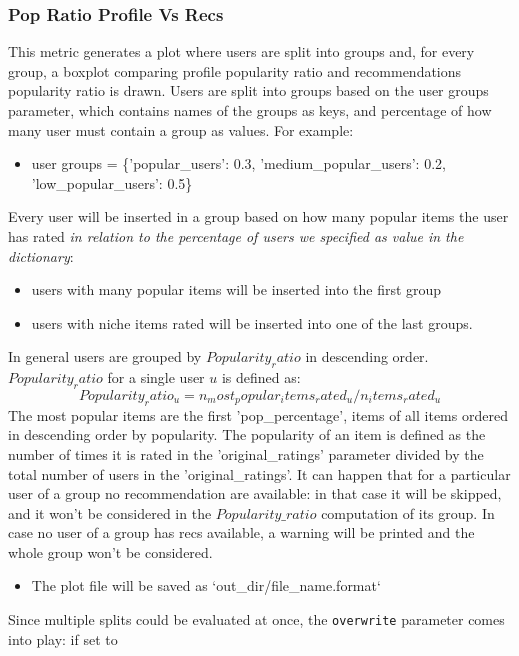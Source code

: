 \documentclass[11pt]{article}
\begin{document}
\subsubsection{Pop Ratio Profile Vs Recs}\label{subsubsec:popratio}
This metric generates a plot where users are split into groups and, for every group, a boxplot comparing
profile popularity ratio and recommendations popularity ratio is drawn.
Users are split into groups based on the user groups parameter, which contains names of the groups as keys,
and percentage of how many user must contain a group as values.
For example:
\begin{itemize}
       \item user groups = \{'popular\_users': 0.3, 'medium\_popular\_users': 0.2, 'low\_popular\_users': 0.5\}
\end{itemize}
\hfill\break
\hfill\break
Every user will be inserted in a group based on how many popular items the user has rated
\textit{in relation to the percentage of users we specified as value in the dictionary}:
\begin{itemize}
    \item users with many popular items will be inserted into the first group
    \item users with niche items rated will be inserted into one of the last groups.
\end{itemize}
\hfill\break
\hfill\break
In general users are grouped by $Popularity_ratio$ in descending order. $Popularity_ratio$ for a single user $u$
is defined as:
\hfill\break
\hfill\break
    \[
        Popularity_ratio_u = n_most_popular_items_rated_u / n_items_rated_u
    \]
\hfill\break
\hfill\break
The most popular items are the first 'pop\_percentage', items of all items ordered in descending order by
popularity.
The popularity of an item is defined as the number of times it is rated in the 'original\_ratings' parameter
divided by the total number of users in the 'original\_ratings'.
It can happen that for a particular user of a group no recommendation are available: in that case it will be skipped,
and it won't be considered in the $Popularity\_ratio$ computation of its group.
In case no user of a group has recs available, a warning will be printed and the whole group won't be considered.
\begin{itemize}
    \item The plot file will be saved as `out\_dir/file\_name.format`
\end{itemize}
\hfill\break
\hfill\break
Since multiple splits could be evaluated at once, the \texttt{overwrite} parameter comes into play: if set to
\end{document}
